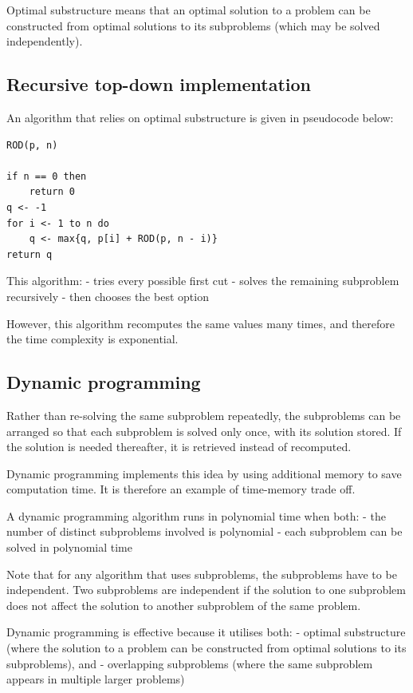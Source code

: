 \documentclass[11pt]{article}
\begin{document}
Optimal substructure means that an optimal solution to a problem can be
constructed from optimal solutions to its subproblems (which may be
solved independently).

    \subsection{Recursive top-down
implementation}\label{recursive-top-down-implementation}

An algorithm that relies on optimal substructure is given in pseudocode
below:

\begin{verbatim}
ROD(p, n)

if n == 0 then
    return 0
q <- -1
for i <- 1 to n do
    q <- max{q, p[i] + ROD(p, n - i)}
return q
\end{verbatim}

This algorithm: - tries every possible first cut - solves the remaining
subproblem recursively - then chooses the best option

However, this algorithm recomputes the same values many times, and
therefore the time complexity is exponential.

    \subsection{Dynamic programming}\label{dynamic-programming}

Rather than re-solving the same subproblem repeatedly, the subproblems
can be arranged so that each subproblem is solved only once, with its
solution stored. If the solution is needed thereafter, it is retrieved
instead of recomputed.

Dynamic programming implements this idea by using additional memory to
save computation time. It is therefore an example of time-memory trade
off.

A dynamic programming algorithm runs in polynomial time when both: - the
number of distinct subproblems involved is polynomial - each subproblem
can be solved in polynomial time

Note that for any algorithm that uses subproblems, the subproblems have
to be independent. Two subproblems are independent if the solution to
one subproblem does not affect the solution to another subproblem of the
same problem.

Dynamic programming is effective because it utilises both: - optimal
substructure (where the solution to a problem can be constructed from
optimal solutions to its subproblems), and - overlapping subproblems
(where the same subproblem appears in multiple larger problems)
\end{document}
